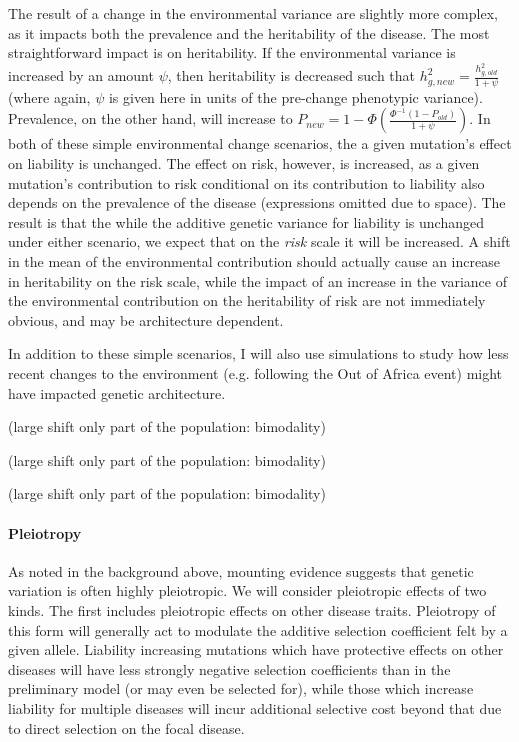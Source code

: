 \documentclass[11pt]{article}
\newcommand{\jb}[1]{{\color{blue} (#1)} }
\begin{document}
The result of a change in the environmental variance are slightly more complex, as it impacts both the prevalence and the heritability of the disease. The most straightforward impact is on heritability. If the environmental variance is increased by an amount $\psi$, then heritability is decreased such that $h^2_{g,new} = \frac{h^2_{g,old}}{1+\psi}$ (where again, $\psi$ is given here in units of the pre-change phenotypic variance). Prevalence, on the other hand, will increase to $P_{new} = 1 - \Phi\left(\frac{\Phi^{-1}\left(1-P_{old}\right)}{1+\psi}\right)$.
In both of these simple environmental change scenarios, the a given mutation's effect on liability is unchanged. The effect on risk, however, is increased, as a given mutation's contribution to risk conditional on its contribution to liability also depends on the prevalence of the disease (expressions omitted due to space). The result is that the while the additive genetic variance for liability is unchanged under either scenario, we expect that on the \textit{risk} scale it will be increased. A shift in the mean of the environmental contribution should actually cause an increase in heritability on the risk scale, while the impact of an increase in the variance of the environmental contribution on the heritability of risk are not immediately obvious, and may be architecture dependent.

In addition to these simple scenarios, I will also use simulations to study how less recent changes to the environment (e.g. following the Out of Africa event) might have impacted genetic architecture.

\jb{large shift only part of the population: bimodality}

\jb{large shift only part of the population: bimodality}

\jb{large shift only part of the population: bimodality}


\paragraph{Pleiotropy}

As noted in the background above, mounting evidence suggests that genetic variation is often highly pleiotropic. We will consider pleiotropic effects of two kinds. The first includes pleiotropic effects on other disease traits. Pleiotropy of this form will generally act to modulate the additive selection coefficient felt by a given allele. Liability increasing mutations which have protective effects on other diseases will have less strongly negative selection coefficients than in the preliminary model (or may even be selected for), while those which increase liability for multiple diseases will incur additional selective cost beyond that due to direct selection on the focal disease.
\end{document}
